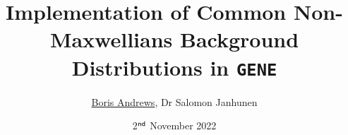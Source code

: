 \documentclass{beamer}
\title[Non-Maxwellian Backgrounds in GENE]{Implementation of Common Non-Maxwellians Background Distributions in {\tt GENE}}
\author{\underline{Boris Andrews}, Dr Salomon Janhunen}
\institute{
    \textit{Tokamak Energy Ltd}
}
\date[2/11/22]{2$^{\sf nd}$ November 2022}
\begin{document}
    \begin{frame}[plain]
        \titlepage
    \end{frame}
    
    
    
\end{document}
